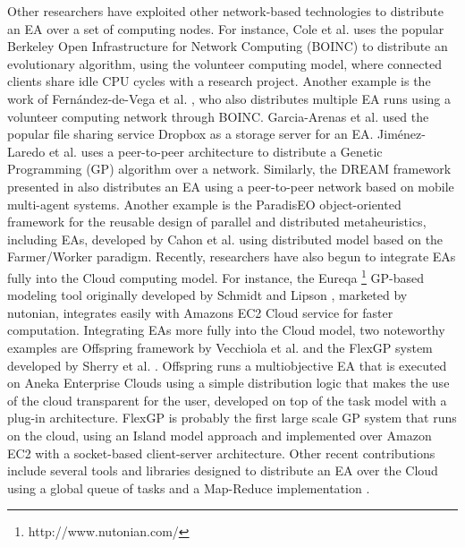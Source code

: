 Other researchers have exploited other network-based technologies to distribute an EA over a set of computing nodes.
For instance, Cole et al. \cite{MilkyWay} uses the popular Berkeley Open Infrastructure for Network Computing (BOINC) to distribute an evolutionary algorithm,
using the volunteer computing model, where connected clients share idle CPU cycles with a research project.
Another example is the work of Fern\'andez-de-Vega et al. \cite{nc}, who also distributes multiple EA runs using a volunteer computing network through BOINC.
Garcia-Arenas et al. \cite{garcia2011} used the popular file sharing service Dropbox as a storage server for an EA.
Jim\'enez-Laredo et al. \cite{garcia2011} uses a peer-to-peer architecture to distribute a Genetic Programming (GP) algorithm over a network.
Similarly, the DREAM framework presented in \cite{DREAM} also distributes an EA using a peer-to-peer network based on mobile multi-agent systems.
Another example is the ParadisEO object-oriented framework for the reusable design of parallel and distributed metaheuristics, including EAs, developed
by Cahon et al. \cite{ParadisEO} using distributed model based on the Farmer/Worker paradigm.
Recently, researchers have also begun to integrate EAs fully into the Cloud computing model.
For instance, the Eureqa \footnote{http://www.nutonian.com/} GP-based modeling tool originally developed by Schmidt and Lipson \cite{free-form}, marketed by nutonian,
integrates easily with Amazons EC2 Cloud service for faster computation.
Integrating EAs more fully into the Cloud model, two noteworthy examples are Offspring framework by Vecchiola et al. \cite{VecchiolaCORR}
and the FlexGP system developed by Sherry et al. \cite{FlexGP}.
Offspring runs a multiobjective EA that is executed on Aneka Enterprise Clouds using a simple distribution logic that makes the use of the cloud
transparent for the user, developed on top of the task model with a plug-in architecture.
FlexGP is probably the first large scale GP system that runs on the cloud, using an Island model approach and implemented over
Amazon EC2 with a socket-based client-server architecture.
Other recent contributions include several tools and libraries designed to distribute an EA over the Cloud using a global queue of tasks and a Map-Reduce
implementation \cite{FlexGP}.


